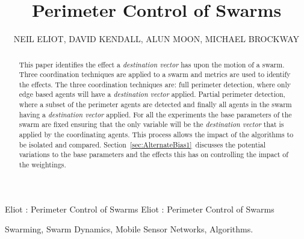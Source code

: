 \documentclass{ieeeaccess}
\begin{document}
\title{Perimeter Control of Swarms}
\author{\uppercase{Neil Eliot},
\uppercase{David Kendall, Alun Moon, Michael Brockway}}
\address[1]{Northumbria University, Department of Computing and Information Sciences, Newcastle upon Tyne, NE1 8ST}
\markboth
{Eliot \headeretal: Perimeter Control of Swarms}
{Eliot \headeretal: Perimeter Control of Swarms}

\begin{abstract}
This paper identifies the effect a \textit{destination vector} has upon the motion of a swarm. Three coordination techniques are applied to a swarm and metrics are used to identify the effects. The three coordination techniques are: full perimeter detection, where only edge based agents will have a \textit{destination vector} applied. Partial perimeter detection, where a subset of the perimeter agents are detected and finally all agents in the swarm having a \textit{destination vector} applied. For all the experiments the base parameters of the swarm are fixed ensuring that the only variable will be the \textit{destination vector} that is applied by the coordinating agents. This process allows the impact of the algorithms to be isolated and compared. Section~\ref{sec:AlternateBias1}~discusses the potential variations to the base parameters and the effects this has on controlling the impact of the weightings.
\end{abstract}

\begin{IEEEkeywords}
Swarming, Swarm Dynamics, Mobile Sensor Networks, Algorithms.
\end{IEEEkeywords}
\end{document}
